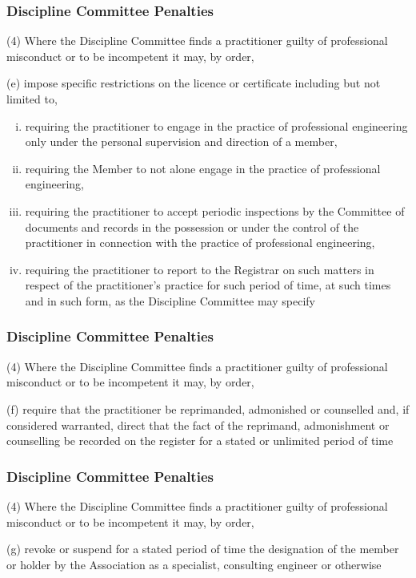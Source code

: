 \begin{frame}
\frametitle{Discipline Committee Penalties}

(4) Where the Discipline Committee finds a practitioner guilty of professional misconduct or to be incompetent it may, by order,

(e) impose specific restrictions on the licence or certificate
		including but not limited to,

\begin{enumerate}[i)]
\item requiring the practitioner to engage in the practice of professional engineering only under the personal supervision and direction of a member,
\item requiring the Member to not alone engage in the practice of professional engineering,
\item requiring the practitioner to accept periodic inspections by the Committee of documents and records in the possession or under the control of the practitioner in connection with the practice of professional engineering,
\item requiring the practitioner to report to the Registrar on such matters in respect of the practitioner's practice for such period of time, at such times and in such form, as the Discipline Committee may specify
\end{enumerate}

\end{frame}

\begin{frame}
\frametitle{Discipline Committee Penalties}

(4) Where the Discipline Committee finds a practitioner guilty of professional misconduct or to be incompetent it may, by order,


(f) require that the practitioner be reprimanded, admonished
		or counselled and, if considered warranted, direct that the
		fact of the reprimand, admonishment or counselling be
		recorded on the register for a stated or unlimited period of
		time


\end{frame}

\begin{frame}
\frametitle{Discipline Committee Penalties}

(4) Where the Discipline Committee finds a practitioner guilty of professional misconduct or to be incompetent it may, by order,


(g) revoke or suspend for a stated period of time the
		designation of the member or holder by the Association as
		a specialist, consulting engineer or otherwise


\end{frame}


